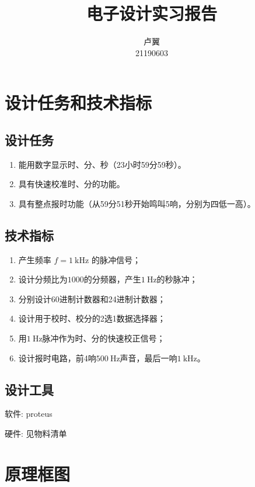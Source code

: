 \documentclass[lang=cn, 11pt, a4paper, cite=authornum, ctexfont]{paper}
\title{电子设计实习报告}
\author{卢翼\\21190603}
\institute{南京师范大学\\ 电气与自动化工程学院}
\date{\zhtoday}
\begin{document}
\maketitle

\tableofcontents
\thispagestyle{empty}

\newpage
\setcounter{page}{1}

\section{设计任务和技术指标}

\subsection{设计任务}

\begin{enumerate}
	\item 能用数字显示时、分、秒（23小时59分59秒）。
	\item 具有快速校准时、分的功能。
	\item 具有整点报时功能（从59分51秒开始鸣叫5响，分别为四低一高）。
\end{enumerate}

\subsection{技术指标}

\begin{enumerate}
	\item 产生频率 $f = \SI{1}{\kilo\hertz}$ 的脉冲信号；
	\item 设计分频比为$1000$的分频器，产生$ \SI{1}{\hertz} $的秒脉冲；       
	\item 分别设计60进制计数器和24进制计数器；
	\item 设计用于校时、校分的2选1数据选择器；
	\item 用$\SI{1}{\hertz}$脉冲作为时、分的快速校正信号；
	\item 设计报时电路，前4响$\SI{500}{\hertz}$声音，最后一响$\SI{1}{\kilo\hertz}$。
\end{enumerate}

\subsection{设计工具}

软件: proteus

硬件: 见物料清单

\section{原理框图}
\end{document}
